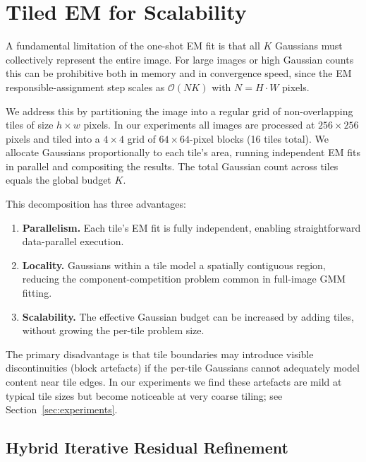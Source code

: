 \documentclass[a4paper,conference]{IEEEtran}
\begin{document}
\section{Tiled EM for Scalability}
\label{sec:tiling}

A fundamental limitation of the one-shot EM fit is that all $K$ Gaussians
must collectively represent the entire image.
For large images or high Gaussian counts this can be prohibitive both in
memory and in convergence speed, since the EM responsible-assignment step
scales as $\mathcal{O}(N K)$ with $N = H\!\cdot\!W$ pixels.

We address this by partitioning the image into a regular grid of
non-overlapping tiles of size $h\!\times\!w$ pixels.
In our experiments all images are processed at $256\!\times\!256$ pixels and
tiled into a $4\!\times\!4$ grid of $64\!\times\!64$-pixel blocks (16 tiles total).
We allocate Gaussians proportionally to each tile's area, running independent
EM fits in parallel and compositing the results.
The total Gaussian count across tiles equals the global budget $K$.

This decomposition has three advantages:
\begin{enumerate}
  \item \textbf{Parallelism.} Each tile's EM fit is fully independent, enabling
        straightforward data-parallel execution.
  \item \textbf{Locality.} Gaussians within a tile model a spatially contiguous
        region, reducing the component-competition problem common in
        full-image GMM fitting.
  \item \textbf{Scalability.} The effective Gaussian budget can be increased
        by adding tiles, without growing the per-tile problem size.
\end{enumerate}

The primary disadvantage is that tile boundaries may introduce visible
discontinuities (block artefacts) if the per-tile Gaussians cannot
adequately model content near tile edges.
In our experiments we find these artefacts are mild at typical tile sizes
but become noticeable at very coarse tiling; see Section~\ref{sec:experiments}.

\subsection{Hybrid Iterative Residual Refinement}
\label{sec:hybrid}
\end{document}
